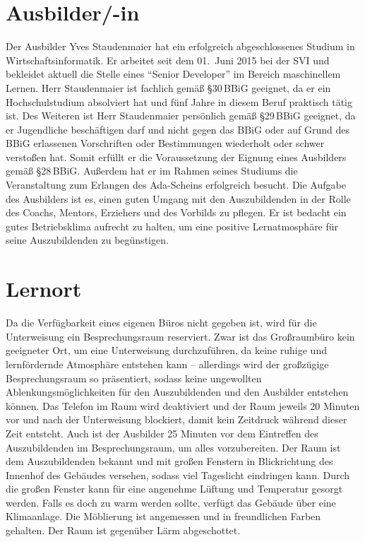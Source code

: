 \section{Ausbilder/-in}
Der Ausbilder Yves Staudenmaier hat ein erfolgreich abgeschlossenes Studium in Wirtschaftsinformatik. Er arbeitet seit dem 01.~Juni 2015 bei der \ac{SVI} und bekleidet aktuell die Stelle eines \enquote{Senior Developer} im Bereich maschinellem Lernen. Herr Staudenmaier ist fachlich gemäß §30\,BBiG geeignet, da er ein Hochschulstudium absolviert hat und fünf Jahre in diesem Beruf praktisch tätig ist. Des Weiteren ist Herr Staudenmaier persönlich gemäß §29\,BBiG geeignet, da er Jugendliche beschäftigen darf und nicht gegen das \ac{BBiG} oder auf Grund des \ac{BBiG} erlassenen Vorschriften oder Bestimmungen wiederholt oder schwer verstoßen hat. Somit erfüllt er die Voraussetzung der Eignung eines Ausbilders gemäß §28\,BBiG. Außerdem hat er im Rahmen seines Studiums die Veranstaltung zum Erlangen des Ada-Scheins erfolgreich besucht. Die Aufgabe des Ausbilders ist es, einen guten Umgang mit den Auszubildenden in der Rolle des Coachs, Mentors, Erziehers und des Vorbilds zu pflegen. Er ist bedacht ein gutes Betriebsklima aufrecht zu halten, um eine positive Lernatmosphäre für seine Auszubildenden zu begünstigen.

\section{Lernort}
Da die Verfügbarkeit eines eigenen Büros nicht gegeben ist, wird für die Unterweisung ein Besprechungsraum reserviert. Zwar ist das Großraumbüro kein geeigneter Ort, um eine Unterweisung durchzuführen, da keine ruhige und lernfördernde Atmosphäre entstehen kann -- allerdings wird der großzügige Besprechungsraum so präsentiert, sodass keine ungewollten Ablenkungsmöglichkeiten für den Auszubildenden und den Ausbilder entstehen können. Das Telefon im Raum wird deaktiviert und der Raum jeweils 20 Minuten vor und nach der Unterweisung blockiert, damit kein Zeitdruck während dieser Zeit entsteht. Auch ist der Ausbilder 25 Minuten vor dem Eintreffen des Auszubildenden im Besprechungsraum, um alles vorzubereiten. Der Raum ist dem Auszubildenden bekannt und mit großen Fenstern in Blickrichtung des Innenhof des Gebäudes versehen, sodass viel Tageslicht eindringen kann. Durch die großen Fenster kann für eine angenehme Lüftung und Temperatur gesorgt werden. Falls es doch zu warm werden sollte, verfügt das Gebäude über eine Klimaanlage. Die Möblierung ist angemessen und in freundlichen Farben gehalten. Der Raum ist gegenüber Lärm abgeschottet. 

